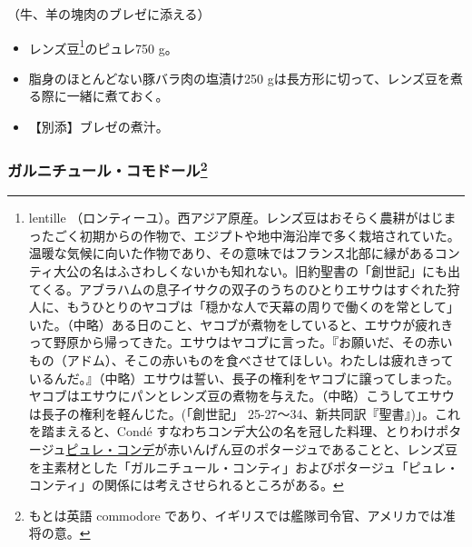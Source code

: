 \begin{recette}

（牛、羊の塊肉のブレゼに添える）

\begin{itemize}
\item
  レンズ豆\footnote{lentille
    （ロンティーユ）。西アジア原産。レンズ豆はおそらく農耕がはじまったごく初期からの作物で、エジプトや地中海沿岸で多く栽培されていた。温暖な気候に向いた作物であり、その意味ではフランス北部に縁があるコンティ大公の名はふさわしくないかも知れない。旧約聖書の「創世記」にも出てくる。アブラハムの息子イサクの双子のうちのひとりエサウはすぐれた狩人に、もうひとりのヤコブは「穏かな人で天幕の周りで働くのを常として」いた。（中略）ある日のこと、ヤコブが煮物をしていると、エサウが疲れきって野原から帰ってきた。エサウはヤコブに言った。『お願いだ、その赤いもの（アドム）、そこの赤いものを食べさせてほしい。わたしは疲れきっているんだ。』（中略）エサウは誓い、長子の権利をヤコブに譲ってしまった。ヤコブはエサウにパンとレンズ豆の煮物を与えた。（中略）こうしてエサウは長子の権利を軽んじた。(「創世記」
    25-27〜34、新共同訳『聖書』)」。これを踏まえると、Condé
    すなわちコンデ大公の名を冠した料理、とりわけポタージュ\protect\hyperlink{puree-conde}{ピュレ・コンデ}が赤いんげん豆のポタージュであることと、レンズ豆を主素材とした「ガルニチュール・コンティ」およびポタージュ「ピュレ・コンティ」の関係には考えさせられるところがある。}のピュレ750
  g。
\item
  脂身のほとんどない豚バラ肉の塩漬け250
  gは長方形に切って、レンズ豆を煮る際に一緒に煮ておく。
\item
  【別添】ブレゼの煮汁。
\end{itemize}

\atoaki{}

\hypertarget{garniture-a-la-commodore}{%
\subsubsection[ガルニチュール・コモドール]{\texorpdfstring{ガルニチュール・コモドール\footnote{もとは英語
  commodore であり、イギリスでは艦隊司令官、アメリカでは准将の意。}}{ガルニチュール・コモドール}}\label{garniture-a-la-commodore}}




\end{recette}

